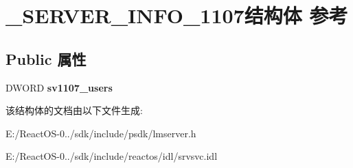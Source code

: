 \hypertarget{struct___s_e_r_v_e_r___i_n_f_o__1107}{}\section{\+\_\+\+S\+E\+R\+V\+E\+R\+\_\+\+I\+N\+F\+O\+\_\+1107结构体 参考}
\label{struct___s_e_r_v_e_r___i_n_f_o__1107}
\subsection*{Public 属性}
\begin{DoxyCompactItemize}
\item 
\mbox{\label{struct___s_e_r_v_e_r___i_n_f_o__1107_ac02f9285589c86c3cadd18d774a6e69b}} 
D\+W\+O\+RD {\bfseries sv1107\+\_\+users}
\end{DoxyCompactItemize}


该结构体的文档由以下文件生成\+:\begin{DoxyCompactItemize}
\item 
E\+:/\+React\+O\+S-\/0../sdk/include/psdk/lmserver.\+h\item 
E\+:/\+React\+O\+S-\/0../sdk/include/reactos/idl/srvsvc.\+idl\end{DoxyCompactItemize}
